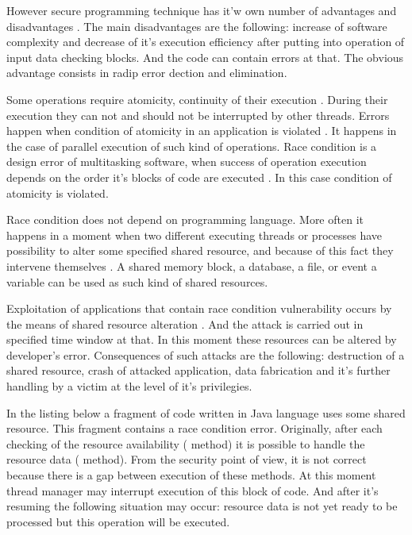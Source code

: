 %
However secure programming technique has it'w own number of advantages and disadvantages . 
%
The main disadvantages are the following: increase of software complexity and decrease of it's execution efficiency after putting into operation of input data checking blocks. 
%
And the code can contain errors at that. 
%
The obvious advantage consists in radip error dection and elimination. 



%
Some operations require atomicity, continuity of their execution . 
%
During their execution they can not and should not be interrupted by other threads. 
%
Errors happen when condition of atomicity in an application is violated . 
%
It happens in the case of parallel execution of such kind of operations. 
%
Race condition is a design error of multitasking software, when success of operation execution depends on the order it's blocks of code are executed . 
%
In this case condition of atomicity is violated. 

%
Race condition does not depend on programming language. 
%
More often it happens in a moment when two different executing threads or processes have possibility to alter some specified shared resource, and because of this fact they intervene themselves  . 
%
A shared memory block, a database, a file, or event a variable can be used as such kind of shared resources. 

%
Exploitation of applications that contain race condition vulnerability occurs by the means of shared resource alteration . 
%
And the attack is carried out in specified time window at that. 
%
In this moment these resources can be altered by developer's error. 
%
Consequences of such attacks are the following: destruction of a shared resource, crash of attacked application, data fabrication and it's further handling by a victim at the level of it's privilegies. 

%
In the listing below a fragment of code written in Java language uses some shared resource. 
%
This fragment contains a race condition error. 
%
Originally, after each checking of the resource availability ( method) it is possible to handle the resource data ( method). 
%
From the security point of view, it is not correct because there is a gap between execution of these methods. 
%
At this moment thread manager may interrupt execution of this block of code. 
%
And after it's resuming the following situation may occur: resource data is not yet ready to be processed but this operation will be executed. 

